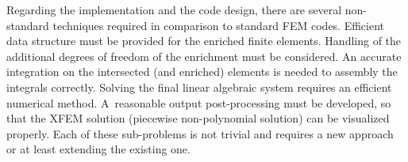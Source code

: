 
Regarding the implementation and the code design, there are several non-standard techniques required
in comparison to standard FEM codes.
Efficient data structure must be provided for the enriched finite elements.
Handling of the additional degrees of freedom of the enrichment must be considered.
An accurate integration on the intersected (and enriched) elements is needed to assembly the integrals correctly. 
Solving the final linear algebraic system requires an efficient numerical method.
A~reasonable output post-processing must be developed, so that the XFEM solution (piecewise non-polynomial solution)
can be visualized properly.
Each of these sub-problems is not trivial and requires a new approach or at least extending the existing one.


% 
% 

